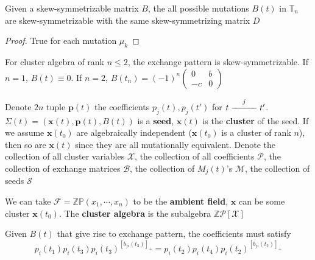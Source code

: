 \documentclass[main]{subfiles}
\begin{document}
\begin{proposition}\label{Mutation of a skew-symmetrizable matrix preserves the skew-symmetrizing matrix}
Given a skew-symmetrizable matrix $B$, the all possible mutations $B(t)$ in $\mathbb T_n$ are skew-symmetrizable with the same skew-symmetrizing matrix $D$
\end{proposition}

\begin{proof}
True for each mutation $\mu_k$
\end{proof}

\begin{remark}
For cluster algebra of rank $n\leq2$, the exchange pattern is skew-symmetrizable. If $n=1$, $B(t)\equiv 0$. If $n=2$, $B(t_n)=(-1)^n\begin{pmatrix}
0&b \\
-c&0
\end{pmatrix}$
\end{remark}

\begin{definition}
Denote $2n$ tuple $\mathbf p(t)$ the coefficients $p_j(t),p_j(t')$ for $t\xedge jt'$. $\Sigma(t)=(\mathbf x(t),\mathbf p(t),B(t))$ is a \textbf{seed}, $\mathbf x(t)$ is the \textbf{cluster} of the seed. If we assume $\mathbf x(t_0)$ are algebraically independent ($\mathbf x(t_0)$ is a cluster of rank $n$), then so are $\mathbf x(t)$ since they are all mutationally equivalent. Denote the collection of all cluster variables $\mathcal X$, the collection of all coefficients $\mathcal P$, the collection of exchange matrices $\mathcal B$, the collection of $M_j(t)$'s $\mathcal M$, the collection of seeds $\mathcal S$ \par
We can take $\mathcal F=\mathbb{ZP}(x_1,\cdots,x_n)$ to be the \textbf{ambient field}, $\mathbf x$ can be some cluster $\mathbf x(t_0)$. The \textbf{cluster algebra} is the subalgebra $\mathbb Z\mathcal P[\mathcal X]$
\end{definition}

\begin{proposition}
Given $B(t)$ that give rise to exchange pattern, the coefficients must satisfy
\begin{equation}\label{exchange pattern on coefficients}
p_i(t_1)p_i(t_3)p_i(t_3)^{[b_{ji}(t_3)]_+}=p_i(t_2)p_i(t_4)p_i(t_2)^{[b_{ji}(t_2)]_+}
\end{equation}
\end{proposition}
\end{document}
